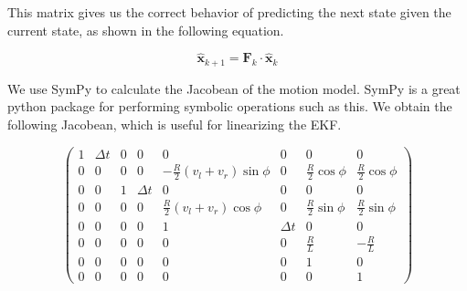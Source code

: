 This matrix gives us the correct behavior of predicting the next state given the current state, as shown in the following equation.

\begin{equation}
    \boldsymbol{\hat{x}}_{k+1} = \boldsymbol{F}_{k} \cdot \boldsymbol{\hat{x}}_{k}
\end{equation}

We use SymPy to calculate the Jacobean of the motion model. SymPy is a great python package for performing symbolic operations such as this. We obtain the following Jacobean, which is useful for linearizing the EKF.

\begin{equation}
    \begin{pmatrix}
    1 & \Delta t & 0 & 0 & 0 & 0 & 0 & 0 \\
    0 & 0 & 0 & 0 & -\frac{R}{2} (v_l + v_r) \sin{\phi} & 0 & \frac{R}{2} \cos{\phi} & \frac{R}{2} \cos{\phi}  \\
    0 & 0 & 1 & \Delta t & 0 & 0 & 0 & 0 \\
    0 & 0 & 0 & 0 & \frac{R}{2} (v_l + v_r) \cos{\phi} & 0 & \frac{R}{2} \sin{\phi}  & \frac{R}{2} \sin{\phi}  \\
    0 & 0 & 0 & 0 & 1 & \Delta t & 0 & 0 \\
    0 & 0 & 0 & 0 & 0 & 0 & \frac{R}{L} & -\frac{R}{L} \\
    0 & 0 & 0 & 0 & 0 & 0 & 1 & 0 \\
    0 & 0 & 0 & 0 & 0 & 0 & 0 & 1
    \end{pmatrix}
\end{equation}